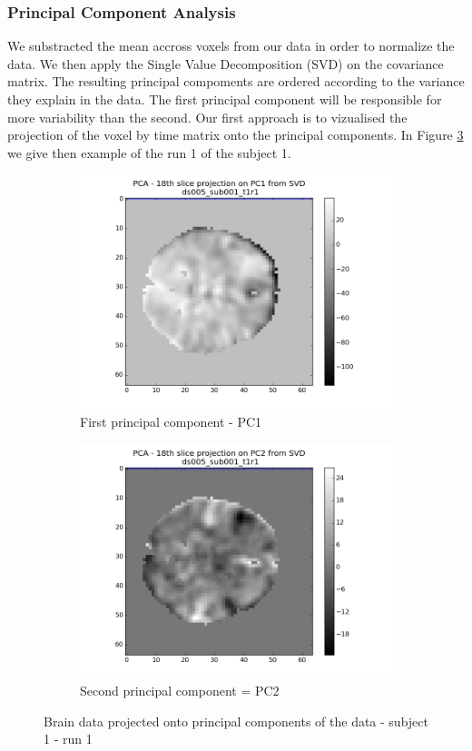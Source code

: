 \subsubsection{Principal Component Analysis}
\noindent
\par We substracted the mean accross voxels from our data in order to normalize the data.
We then apply the Single Value Decomposition (SVD) on the covariance matrix. The resulting
principal compoments are ordered according to the variance they explain in the data. 
The first principal component will be responsible for more variability than the second.
Our first approach is to vizualised the projection of the voxel by time matrix onto 
the principal components. In Figure \ref{fig:pcaa} we give then example of the run 1 
of the subject 1. 

\begin{figure}[H]
\begin{subfigure}{.5\textwidth}
    \centering
    \includegraphics[width=.9\linewidth]{../fig/pca/ds005_sub001_t1r1_PC1.png}
    \caption{First principal component - PC1}
    \label{fig:pca1}
\end{subfigure}%
\begin{subfigure}{.5\textwidth}
    \centering
    \includegraphics[width=.9\linewidth]{../fig/pca/ds005_sub001_t1r1_PC2.png}
    \caption{Second principal component = PC2}
    \label{fig:pca2}
\end{subfigure}
\caption{Brain data projected onto principal components of the data  - subject 1 - run 1}
\label{fig:pcaa}
\end{figure}

